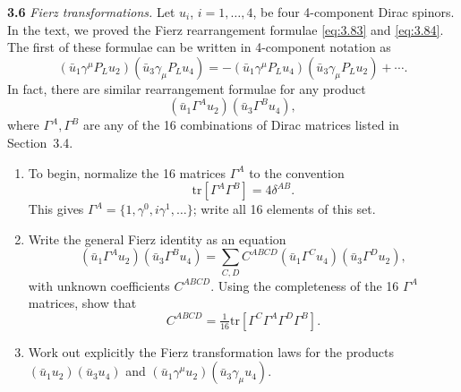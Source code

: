 \textbf{3.6} \emph{Fierz transformations.}  Let $u_i$, $i = 1, \ldots, 4$, be
four 4-component Dirac spinors.  In the text, we proved the Fierz
rearrangement formulae \eqref{eq:3.83} and \eqref{eq:3.84}.  The first of
these formulae can be written in 4-component notation as
\begin{equation}
  (\bar{u}_1\gamma^\mu P_L u_2)(\bar{u}_3\gamma_\mu P_L u_4)
    = -(\bar{u}_1\gamma^\mu P_L u_4)(\bar{u}_3\gamma_\mu P_L u_2)
      + \cdots .
\end{equation}
In fact, there are similar rearrangement formulae for any product
\begin{equation}
  (\bar{u}_1\Gamma^A u_2)(\bar{u}_3\Gamma^B u_4),
\end{equation}
where $\Gamma^A, \Gamma^B$ are any of the 16 combinations of Dirac matrices
listed in Section~3.4.
\begin{enumerate}[label=(\alph*)]
  \item To begin, normalize the 16 matrices $\Gamma^A$ to the convention
    \begin{equation}
      \mathrm{tr}[\Gamma^A\Gamma^B] = 4\delta^{AB} .
    \end{equation}
    This gives $\Gamma^A = \{1, \gamma^0, i\gamma^1, \ldots\}$; write all 16
    elements of this set.
  \item Write the general Fierz identity as an equation
    \begin{equation}
      (\bar{u}_1\Gamma^A u_2)(\bar{u}_3\Gamma^B u_4) =
        \sum_{C,D} C^{ABCD}(\bar{u}_1\Gamma^C u_4)(\bar{u}_3\Gamma^D u_2),
    \end{equation}
    with unknown coefficients $C^{ABCD}$.  Using the completeness of the 16
    $\Gamma^A$ matrices, show that
    \begin{equation}
      C^{ABCD} = \tfrac{1}{16}\mathrm{tr}[\Gamma^C\Gamma^A\Gamma^D\Gamma^B] .
    \end{equation}
  \item Work out explicitly the Fierz transformation laws for the products
    $(\bar{u}_1u_2)(\bar{u}_3u_4)$ and
    $(\bar{u}_1\gamma^\mu u_2)(\bar{u}_3\gamma_\mu u_4)$.
\end{enumerate}

